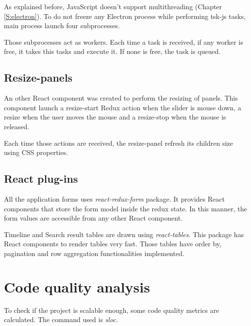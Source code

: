 As explained before, JavaScript doesn't support multithreading (Chapter
\ref{S:electron}). To do not freeze any Electron process while performing
tsk-js tasks, main process launch four subprocesses.

Those subprocesses act as workers. Each time a task is received, if any worker
is free, it takes this tasks and execute it. If none is free, the task is 
queued.

\subsection{Resize-panels}

An other React component was created to perform the resizing of panels. This
component launch a resize-start Redux action when the slider is mouse down, a
resize when the user moves the mouse and a resize-stop when the mouse is 
released.

Each time those actions are received, the resize-panel refresh its children
size using CSS properties.

\subsection{React plug-ins}

All the application forms uses \textit{react-redux-form} package. It provides
React components that store the form model inside the redux state. In this
manner, the form values are accessible from any other React component.

Timeline and Search result tables are drawn using \textit{react-tables}. This 
package has React components to render tables very fast. Those tables have 
order by, pagination and row aggregation functionalities implemented.

\section{Code quality analysis}


To check if the project is scalable enough, some code quality metrics are 
calculated. The command used is \textit{sloc}.


\begin{terminal}[
	caption=Code quality CSV extraction using sloc,
	label=L:sloc-code-quality
]
%
%

\end{terminal}

